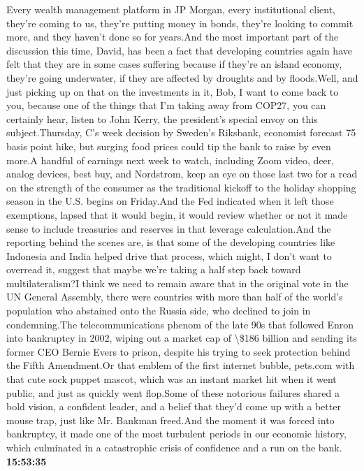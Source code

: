 \documentclass{article}%
\begin{document}
Every wealth management platform in JP Morgan, every institutional client, they're coming to us, they're putting money in bonds, they're looking to commit more, and they haven't done so for years.And the most important part of the discussion this time, David, has been a fact that developing countries again have felt that they are in some cases suffering because if they're an island economy, they're going underwater, if they are affected by droughts and by floods.Well, and just picking up on that on the investments in it, Bob, I want to come back to you, because one of the things that I'm taking away from COP27, you can certainly hear, listen to John Kerry, the president's special envoy on this subject.Thursday, C's week decision by Sweden's Riksbank, economist forecast 75 basis point hike, but surging food prices could tip the bank to raise by even more.A handful of earnings next week to watch, including Zoom video, deer, analog devices, best buy, and Nordstrom, keep an eye on those last two for a read on the strength of the consumer as the traditional kickoff to the holiday shopping season in the U.S. begins on Friday.And the Fed indicated when it left those exemptions, lapsed that it would begin, it would review whether or not it made sense to include treasuries and reserves in that leverage calculation.And the reporting behind the scenes are, is that some of the developing countries like Indonesia and India helped drive that process, which might, I don't want to overread it, suggest that maybe we're taking a half step back toward multilateralism?I think we need to remain aware that in the original vote in the UN General Assembly, there were countries with more than half of the world's population who abstained onto the Russia side, who declined to join in condemning.The telecommunications phenom of the late 90s that followed Enron into bankruptcy in 2002, wiping out a market cap of \textbackslash{}\$186 billion and sending its former CEO Bernie Evers to prison, despite his trying to seek protection behind the Fifth Amendment.Or that emblem of the first internet bubble, pets.com with that cute sock puppet mascot, which was an instant market hit when it went public, and just as quickly went flop.Some of these notorious failures shared a bold vision, a confident leader, and a belief that they'd come up with a better mouse trap, just like Mr. Bankman freed.And the moment it was forced into bankruptcy, it made one of the most turbulent periods in our economic history, which culminated in a catastrophic crisis of confidence and a run on the bank.%
\textbf{15:53:35}%
\end{document}
